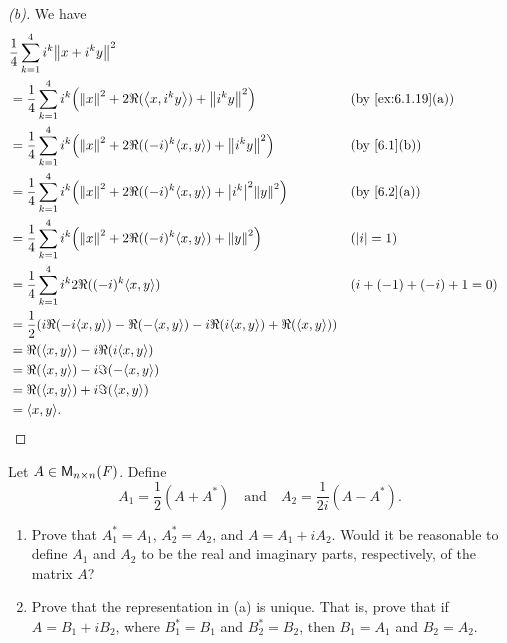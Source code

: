 \begin{proof}[(b)]
  We have
  \begin{align*}
     & \frac{1}{4} \sum_{k = 1}^4 i^k \norm{x + i^k y}^2                                                                                         \\
     & = \frac{1}{4} \sum_{k = 1}^4 i^k \pa{\norm{x}^2 + 2 \Re(\inn{x, i^k y}) + \norm{i^k y}^2}            &  & \text{(by \cref{ex:6.1.19}(a))} \\
     & = \frac{1}{4} \sum_{k = 1}^4 i^k \pa{\norm{x}^2 + 2 \Re((-i)^k \inn{x, y}) + \norm{i^k y}^2}         &  & \text{(by \cref{6.1}(b))}       \\
     & = \frac{1}{4} \sum_{k = 1}^4 i^k \pa{\norm{x}^2 + 2 \Re((-i)^k \inn{x, y}) + \abs{i^k}^2 \norm{y}^2} &  & \text{(by \cref{6.2}(a))}       \\
     & = \frac{1}{4} \sum_{k = 1}^4 i^k \pa{\norm{x}^2 + 2 \Re((-i)^k \inn{x, y}) + \norm{y}^2}             &  & (\abs{i} = 1)                   \\
     & = \frac{1}{4} \sum_{k = 1}^4 i^k 2 \Re((-i)^k \inn{x, y})                                            &  & (i + (-1) + (-i) + 1 = 0)       \\
     & = \frac{1}{2} \pa{i \Re(-i \inn{x, y}) - \Re(-\inn{x, y}) - i \Re(i \inn{x, y}) + \Re(\inn{x, y})}                                        \\
     & = \Re(\inn{x, y}) - i \Re(i \inn{x, y})                                                                                                   \\
     & = \Re(\inn{x, y}) - i \Im(-\inn{x, y})                                                                                                    \\
     & = \Re(\inn{x, y}) + i \Im(\inn{x, y})                                                                                                     \\
     & = \inn{x, y}.
  \end{align*}
\end{proof}

\begin{ex}\label{ex:6.1.21}
  Let \(A \in \mathsf{M}_{{n} \times n}({\mathit{F}})\).
  Define
  \[
    A_1 = \frac{1}{2} (A + A^*) \quad \text{and} \quad A_2 = \frac{1}{2i} (A - A^*).
  \]
  \begin{enumerate}
    \item Prove that \(A_1^* = A_1\), \(A_2^* = A_2\), and \(A = A_1 + i A_2\).
          Would it be reasonable to define \(A_1\) and \(A_2\) to be the real and imaginary parts, respectively, of the matrix \(A\)?
    \item Prove that the representation in (a) is unique.
          That is, prove that if \(A = B_1 + i B_2\), where \(B_1^* = B_1\) and \(B_2^* = B_2\), then \(B_1 = A_1\) and \(B_2 = A_2\).
  \end{enumerate}
\end{ex}

